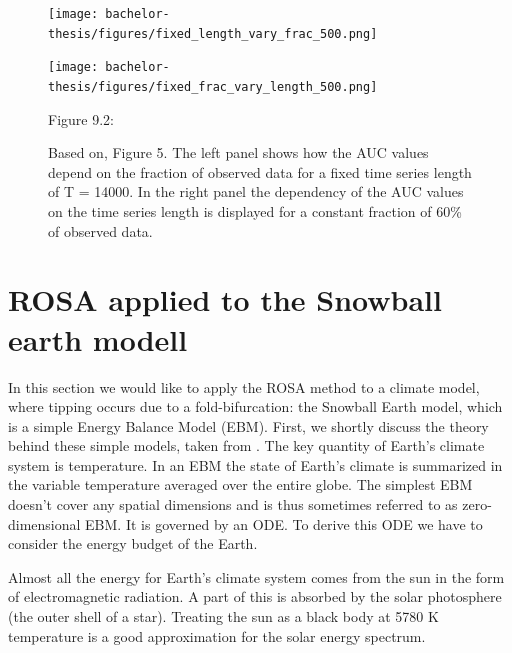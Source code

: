\documentclass[%
thesis=student,%
coverpage=false,%
titlepage=false,%
headmarks=true, %
english,%
font=libertine, %
math=newpxtx, %
BCOR=5mm,%
coverBCOR=11mm%
]{tumbook}
\begin{document}
\begin{figure}[h!]
    \centering
    \begin{minipage}[t]{0.45\textwidth}
        \centering
        \texttt{[image: bachelor-thesis/figures/fixed\_length\_vary\_frac\_500.png]}
    \end{minipage}
    \hfill
    \begin{minipage}[t]{0.45\textwidth}
        \centering
        \texttt{[image: bachelor-thesis/figures/fixed\_frac\_vary\_length\_500.png]}
    \end{minipage}
    \vspace{0.5cm}
    
    \centering
    \begin{minipage}[b]{0.9\textwidth}
        \centering     
        Figure 9.2: 
    \end{minipage}
    \caption{Based on\cite{Morr:2024}, Figure 5. The left panel shows how the AUC values depend on the fraction of observed data for a fixed time series length of T = 14000. In the right panel the dependency of the AUC values on the time series length is displayed for a constant fraction of 60\% of observed data. }
    \label{fig:time_length_and_fraction_of_observed_data_dependence}
\end{figure}


\chapter{ROSA applied to the Snowball earth modell}

In this section we would like to apply the ROSA method to a climate model, where tipping occurs due to a fold-bifurcation: the Snowball Earth model, which is a simple Energy Balance Model (EBM). First, we shortly discuss the theory behind these simple models, taken from \cite{Kaper:2013}. The key quantity of Earth's climate system is temperature. In an EBM the state of Earth's climate is summarized in the variable temperature averaged over the entire globe. The simplest EBM doesn't cover any spatial dimensions and is thus sometimes referred to as zero-dimensional EBM. It is governed by an ODE. To derive this ODE we have to consider the energy budget of the Earth.

Almost all the energy for Earth's climate system comes from the sun in the form of electromagnetic radiation. A part of this is absorbed by the solar photosphere (the outer shell of a star). Treating the sun as a black body at 5780 K temperature is a good approximation for the solar energy spectrum.
\end{document}
